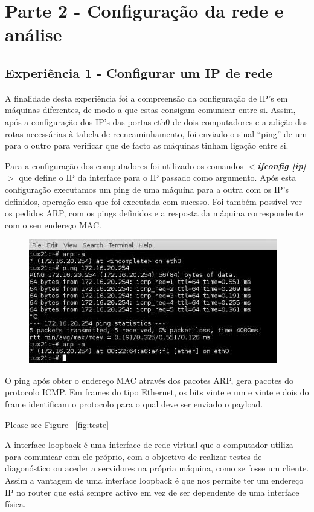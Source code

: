 \documentclass[a4paper]{article}
\begin{document}
\section{Parte 2 - Configuração da rede e análise}
\subsection{Experiência 1 - Configurar um IP de rede}
A finalidade desta experiência foi a compreensão da configuração de IP’s em máquinas diferentes, de modo a que estas consigam comunicar entre si. Assim, após a configuração dos IP’s das portas eth0 de dois computadores e a adição das rotas necessárias à tabela de reencaminhamento, foi enviado o sinal “ping” de um para o outro para verificar que de facto as máquinas tinham ligação entre si.

Para a configuração dos computadores foi utilizado os comandos \textbf{\textit{$<$ifconfig [ip]$>$}} que define o IP da interface para o IP passado como argumento. Após esta configuração executamos um ping de uma máquina para a outra com os IP’s definidos, operação essa que foi executada com sucesso. Foi também possível ver os pedidos ARP, com os pings definidos e a resposta da máquina correspondente com o seu endereço MAC.

\begin{figure}[h!]
\centering
\includegraphics[scale=0.5]{res/image1.jpg}
\end{figure}

O ping após obter o endereço MAC através dos pacotes ARP, gera pacotes do protocolo ICMP. Em frames do tipo Ethernet, os bits vinte e um e vinte e dois do frame identificam o protocolo para o qual deve ser enviado o payload.

\pagebreak

Please see Figure ~\autoref{fig:teste}

A interface loopback é uma interface de rede virtual que o computador utiliza para comunicar com ele próprio, com o objectivo de realizar testes de diagonóstico ou aceder a servidores na própria máquina, como se fosse um cliente. Assim a vantagem de uma interface loopback é que nos permite ter um endereço IP no router que está sempre activo em vez de ser dependente de uma interface física.
\end{document}
